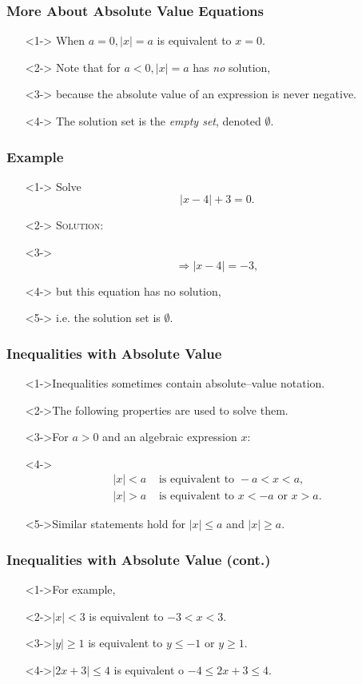 \documentclass{beamer}
\begin{document}
\begin{frame}
  \frametitle{More About Absolute Value Equations}
  \begin{enumerate}
    \item[]<1-> When $a=0, |x|=a$ is equivalent to $x=0$.
    \item[]<2-> Note that for $a<0, |x|=a$ has \emph{no} solution,
    \item[]<3-> because the absolute value of an expression is never negative.
    \item[]<4-> The solution set is the \emph{empty set}, denoted $\emptyset$.
  \end{enumerate}
\end{frame}

\begin{frame}
  \frametitle{Example}
  \begin{enumerate}
    \item[]<1-> Solve \[ |x-4|+3=0. \]
    \item[]<2-> \textsc{Solution:}
    \item[]<3-> \[ \Rightarrow |x-4|=-3,\]
    \item[]<4-> but this equation has no solution,
    \item[]<5-> i.e. the solution set is $\emptyset$.
  \end{enumerate}
\end{frame}

\begin{frame}
  \frametitle{Inequalities with Absolute Value}
  \begin{enumerate}
    \item[]<1->Inequalities sometimes contain absolute--value notation.
    \item[]<2->The following properties are used to solve them.
    \item[]<3->For $a>0$ and an algebraic expression $x$:
    \item[]<4->
    \begin{align*}
      |x|<a & \text{ is equivalent to } -a<x<a, \\
      |x|>a & \text{ is equivalent to } x<-a \text{ or }x>a.
    \end{align*}
    \item[]<5->Similar statements hold for $|x| \leq a$ and $|x| \geq a$.
  \end{enumerate}
\end{frame}

\begin{frame}
  \frametitle{Inequalities with Absolute Value (cont.)}
  \begin{enumerate}
    \item[]<1->For example,
    \item[]<2->$|x|<3$ is equivalent to $-3<x<3$.
    \item[]<3->$|y| \geq 1$ is equivalent to $y \leq -1$ or $y \geq 1$.
    \item[]<4->$|2x+3| \leq 4$ is equivalent o $-4 \leq 2x+3 \leq 4$.
  \end{enumerate}
\end{frame}
\end{document}
